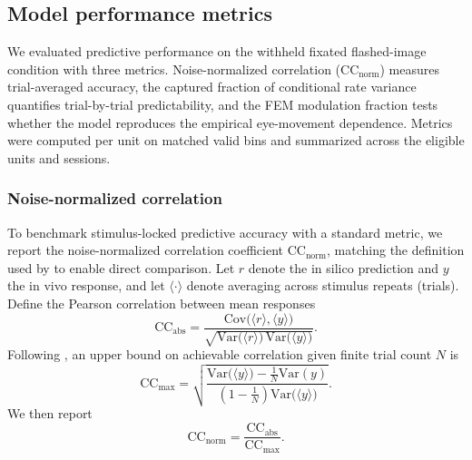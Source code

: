 \documentclass{lite}
\begin{document}
\subsection{Model performance metrics}
We evaluated predictive performance on the withheld fixated flashed-image condition with three metrics. Noise-normalized correlation ($\mathrm{CC}_{\mathrm{norm}}$) measures trial-averaged accuracy, the captured fraction of conditional rate variance quantifies trial-by-trial predictability, and the FEM modulation fraction tests whether the model reproduces the empirical eye-movement dependence. Metrics were computed per unit on matched valid bins and summarized across the eligible units and sessions.

\subsubsection{Noise-normalized correlation}
To benchmark stimulus-locked predictive accuracy with a standard metric, we report the noise-normalized correlation coefficient $\mathrm{CC}_{\mathrm{norm}}$, matching the definition used by \cite{wang2025foundation} to enable direct comparison. Let $r$ denote the in silico prediction and $y$ the in vivo response, and let $\langle \cdot \rangle$ denote averaging across stimulus repeats (trials). Define the Pearson correlation between mean responses
\begin{equation}
\mathrm{CC}_{\mathrm{abs}}
=
\frac{\mathrm{Cov}\!\big(\langle r \rangle,\langle y \rangle\big)}
{\sqrt{\mathrm{Var}\!\big(\langle r \rangle\big)\,\mathrm{Var}\!\big(\langle y \rangle\big)}}.
\end{equation}
Following \cite{schoppe2016measuring}, an upper bound on achievable correlation given finite trial count $N$ is
\begin{equation}
\mathrm{CC}_{\max}
=
\sqrt{
\frac{\mathrm{Var}\!\big(\langle y \rangle\big)-\frac{1}{N}\mathrm{Var}(y)}
{\left(1-\frac{1}{N}\right)\mathrm{Var}\!\big(\langle y \rangle\big)}
}.
\end{equation}
We then report
\begin{equation}
\mathrm{CC}_{\mathrm{norm}}
=
\frac{\mathrm{CC}_{\mathrm{abs}}}{\mathrm{CC}_{\max}}.
\end{equation}
\end{document}

